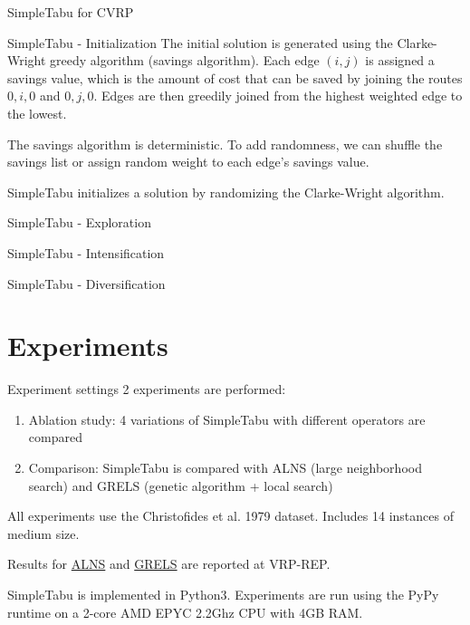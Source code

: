 \documentclass[9pt]{beamer}
\begin{document}
\begin{frame}{SimpleTabu for CVRP}

\end{frame}

\begin{frame}{SimpleTabu - Initialization}
    The initial solution is generated using the Clarke-Wright greedy algorithm (savings algorithm). Each edge $(i, j)$ is assigned a savings value, which is the amount of cost that can be saved by joining the routes $0, i, 0$ and $0, j, 0$. Edges are then greedily joined from the highest weighted edge to the lowest.

    The savings algorithm is deterministic. To add randomness, we can shuffle the savings list or assign random weight to each edge's savings value.

    SimpleTabu initializes a solution by randomizing the Clarke-Wright algorithm.
\end{frame}

\begin{frame}{SimpleTabu - Exploration}

\end{frame}

\begin{frame}{SimpleTabu - Intensification}

\end{frame}

\begin{frame}{SimpleTabu - Diversification}

\end{frame}

\section{Experiments}
\begin{frame}{Experiment settings}
2 experiments are performed:
\begin{enumerate}
    \item Ablation study: 4 variations of SimpleTabu with different operators are compared
    \item Comparison: SimpleTabu is compared with ALNS (large neighborhood search) and GRELS (genetic algorithm + local search)
\end{enumerate}

All experiments use the Christofides et al. 1979 dataset. Includes 14 instances of medium size.

Results for \href{http://www.vrp-rep.org/references/item/pisinger-and-ropke-2007.html}{ALNS} and \href{http://www.vrp-rep.org/references/item/prins-2009.html}{GRELS} are reported at VRP-REP.

SimpleTabu is implemented in Python3. Experiments are run using the PyPy runtime on a 2-core AMD EPYC 2.2Ghz CPU with 4GB RAM.
\end{frame}
\end{document}

